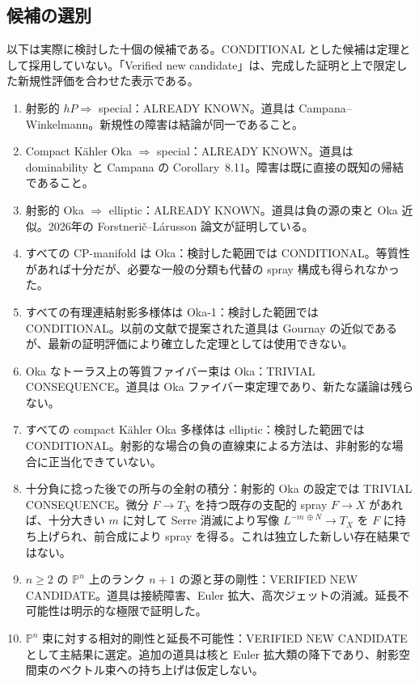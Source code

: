 \documentclass[12pt]{amsart}
\theoremstyle{definition}
\theoremstyle{remark}
\numberwithin{equation}{section}
\newcommand{\mP}{\mathbb{P}}
\begin{document}
\subsection{候補の選別}
以下は実際に検討した十個の候補である。CONDITIONAL とした候補は定理として採用していない。「Verified new candidate」は、完成した証明と上で限定した新規性評価を合わせた表示である。
\begin{enumerate}
\item 射影的 $hP\Rightarrow$ special：ALREADY KNOWN。道具は Campana--Winkelmann。新規性の障害は結論が同一であること。
\item Compact K\"ahler Oka $\Rightarrow$ special：ALREADY KNOWN。道具は dominability と Campana の Corollary~8.11。障害は既に直接の既知の帰結であること。
\item 射影的 Oka $\Rightarrow$ elliptic：ALREADY KNOWN。道具は負の源の束と Oka 近似。2026年の Forstneri\v c--L\'arusson 論文が証明している。
\item すべての CP-manifold は Oka：検討した範囲では CONDITIONAL。等質性があれば十分だが、必要な一般の分類も代替の spray 構成も得られなかった。
\item すべての有理連結射影多様体は Oka-1：検討した範囲では CONDITIONAL。以前の文献で提案された道具は Gournay の近似であるが、最新の証明評価により確立した定理としては使用できない。
\item Oka なトーラス上の等質ファイバー束は Oka：TRIVIAL CONSEQUENCE。道具は Oka ファイバー束定理であり、新たな議論は残らない。
\item すべての compact K\"ahler Oka 多様体は elliptic：検討した範囲では CONDITIONAL。射影的な場合の負の直線束による方法は、非射影的な場合に正当化できていない。
\item 十分負に捻った後での所与の全射の積分：射影的 Oka の設定では TRIVIAL CONSEQUENCE。微分 $F\to T_X$ を持つ既存の支配的 spray $F\to X$ があれば、十分大きい $m$ に対して Serre 消滅により写像 $L^{-m\,\oplus N}\to T_X$ を $F$ に持ち上げられ、前合成により spray を得る。これは独立した新しい存在結果ではない。
\item $n\geq2$ の $\mP^n$ 上のランク $n+1$ の源と芽の剛性：VERIFIED NEW CANDIDATE。道具は接続障害、Euler 拡大、高次ジェットの消滅。延長不可能性は明示的な極限で証明した。
\item $\mP^n$ 束に対する相対的剛性と延長不可能性：VERIFIED NEW CANDIDATE として主結果に選定。追加の道具は核と Euler 拡大類の降下であり、射影空間束のベクトル束への持ち上げは仮定しない。
\end{enumerate}
\end{document}
